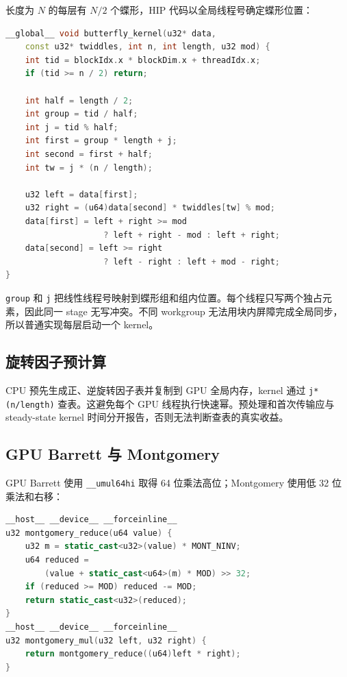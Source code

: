 长度为 $N$ 的每层有 $N/2$ 个蝶形，HIP 代码以全局线程号确定蝶形位置：

\begin{lstlisting}[title=GPU蝶形kernel,label={lst:gpu-butterfly},language={C++}]
__global__ void butterfly_kernel(u32* data,
    const u32* twiddles, int n, int length, u32 mod) {
    int tid = blockIdx.x * blockDim.x + threadIdx.x;
    if (tid >= n / 2) return;

    int half = length / 2;
    int group = tid / half;
    int j = tid % half;
    int first = group * length + j;
    int second = first + half;
    int tw = j * (n / length);

    u32 left = data[first];
    u32 right = (u64)data[second] * twiddles[tw] % mod;
    data[first] = left + right >= mod
                    ? left + right - mod : left + right;
    data[second] = left >= right
                    ? left - right : left + mod - right;
}
\end{lstlisting}

\texttt{group} 和 \texttt{j} 把线性线程号映射到蝶形组和组内位置。每个线程只写两个独占元素，因此同一 stage 无写冲突。不同 workgroup 无法用块内屏障完成全局同步，所以普通实现每层启动一个 kernel。

\subsection{旋转因子预计算}

CPU 预先生成正、逆旋转因子表并复制到 GPU 全局内存，kernel 通过 \texttt{j*(n/length)} 查表。这避免每个 GPU 线程执行快速幂。预处理和首次传输应与 steady-state kernel 时间分开报告，否则无法判断查表的真实收益。

\subsection{GPU Barrett 与 Montgomery}

GPU Barrett 使用 \texttt{\_\_umul64hi} 取得 64 位乘法高位；Montgomery 使用低 32 位乘法和右移：

\begin{lstlisting}[title=GPU Montgomery模乘,label={lst:gpu-mont},language={C++}]
__host__ __device__ __forceinline__
u32 montgomery_reduce(u64 value) {
    u32 m = static_cast<u32>(value) * MONT_NINV;
    u64 reduced =
        (value + static_cast<u64>(m) * MOD) >> 32;
    if (reduced >= MOD) reduced -= MOD;
    return static_cast<u32>(reduced);
}
__host__ __device__ __forceinline__
u32 montgomery_mul(u32 left, u32 right) {
    return montgomery_reduce((u64)left * right);
}
\end{lstlisting}


